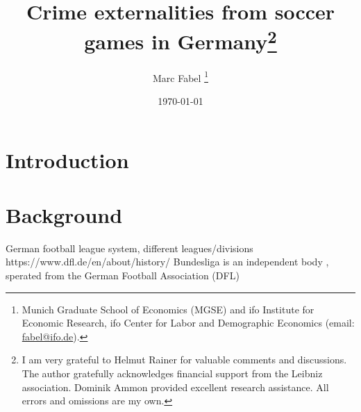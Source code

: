 \documentclass[11pt, a4paper]{article} %
\title{Crime externalities from soccer games in Germany\footnote{I am very grateful to Helmut Rainer for valuable comments and discussions. The author gratefully acknowledges financial support from the Leibniz association. Dominik Ammon provided excellent research assistance. All errors and omissions are my own.
}}
\author{
	Marc Fabel 
		\thanks{Munich Graduate School of Economics (MGSE) and ifo Institute for Economic Research, ifo Center for Labor and Demographic Economics (email: \href{mailto:fabel@ifo.de}{fabel@ifo.de}).
		}
}
\date{\monthyeardate\today}
\begin{document}
\setcounter{page}{0}  
\newpage
\setcounter{page}{1}    
\maketitle



\bigskip
\tableofcontents

\newpage


\section{Introduction}\label{sec_soc_ext:introduction}






\bigskip
\section{Background}\label{sec_soc_ext:background}

German football league system, different leagues/divisions
https://www.dfl.de/en/about/history/
Bundesliga is an independent body , sperated from the German Football Association (DFL)

\end{document}
